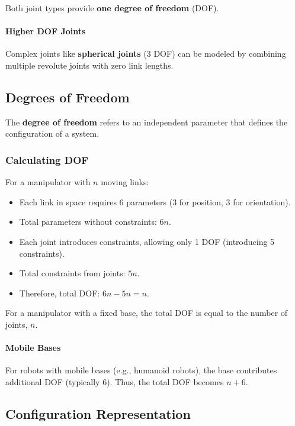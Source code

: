 \documentclass{article}
\begin{document}
Both joint types provide \textbf{one degree of freedom} (DOF).

\paragraph{Higher DOF Joints}

Complex joints like \textbf{spherical joints} (3 DOF) can be modeled by combining multiple revolute joints with zero link lengths.

\subsection{Degrees of Freedom}

The \textbf{degree of freedom} refers to an independent parameter that defines the configuration of a system.

\subsubsection{Calculating DOF}

For a manipulator with $n$ moving links:

\begin{itemize}
    \item Each link in space requires 6 parameters (3 for position, 3 for orientation).
    \item Total parameters without constraints: $6n$.
    \item Each joint introduces constraints, allowing only 1 DOF (introducing 5 constraints).
    \item Total constraints from joints: $5n$.
    \item Therefore, total DOF: $6n - 5n = n$.
\end{itemize}

For a manipulator with a fixed base, the total DOF is equal to the number of joints, $n$.

\paragraph{Mobile Bases}

For robots with mobile bases (e.g., humanoid robots), the base contributes additional DOF (typically 6). Thus, the total DOF becomes $n + 6$.

\subsection{Configuration Representation}
\end{document}
